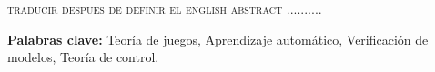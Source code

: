 \begin{resumen}


\textsc{traducir despues de definir el english abstract ..........}


\begin{flushleft}
\textbf{Palabras clave:} Teoría de juegos, Aprendizaje automático, Verificación de modelos, Teoría de control.
\end{flushleft}

\end{resumen}
